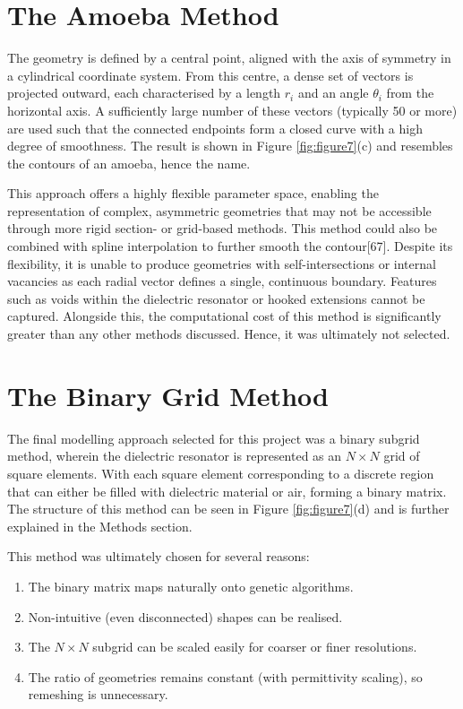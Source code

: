 \section{The Amoeba Method}
\label{sec:section9}
The geometry is defined by a central point, aligned with the axis of symmetry
in a cylindrical coordinate system. From this centre, a dense set of vectors is
projected outward, each characterised by a length $r_i$ and an angle $\theta_i$
from the horizontal axis. A sufficiently large number of these vectors
(typically 50 or more) are used such that the connected endpoints form a closed
curve with a high degree of smoothness. The result is shown in Figure
\ref{fig:figure7}(c) and resembles the contours of an amoeba, hence the name.

This approach offers a highly flexible parameter space, enabling the
representation of complex, asymmetric geometries that may not be accessible
through more rigid section- or grid-based methods. This method could also be
combined with spline interpolation to further smooth the contour[67]. Despite
its flexibility, it is unable to produce geometries with self-intersections or
internal vacancies as each radial vector defines a single, continuous boundary.
Features such as voids within the dielectric resonator or hooked extensions
cannot be captured. Alongside this, the computational cost of this method is
significantly greater than any other methods discussed. Hence, it was ultimately
not selected.

\section{The Binary Grid Method}
\label{sec:section10}
The final modelling approach selected for this project was a binary subgrid
method, wherein the dielectric resonator is represented as an $N\times N$ grid
of square elements. With each square element corresponding to a discrete region
that can either be filled with dielectric material or air, forming a binary
matrix. The structure of this method can be seen in Figure \ref{fig:figure7}(d)
and is further explained in the Methods section.

This method was ultimately chosen for several reasons:

\begin{enumerate}
  \item The binary matrix maps naturally onto genetic algorithms.
  \item Non-intuitive (even disconnected) shapes can be realised.
  \item The $N\times N$ subgrid can be scaled easily for coarser or finer
    resolutions.
  \item The ratio of geometries remains constant (with permittivity scaling),
    so remeshing is unnecessary.
\end{enumerate}

